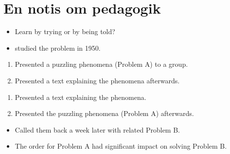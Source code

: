 \mode*

\section{En notis om pedagogik}

\begin{frame}
  \begin{question}
    \begin{itemize}
      \item Learn by trying or by being told?
    \end{itemize}
  \end{question}
\end{frame}

\begin{frame}
  \begin{example}
    \begin{itemize}
      \item \Textcite{Szekely1950} studied the problem in 1950.
    \end{itemize}
    \begin{enumerate}
      \item<2,3> Presented a puzzling phenomena (Problem A) to a group.
      \item<2,3> Presented a text explaining the phenomena afterwards.
    \end{enumerate}
    \begin{enumerate}
      \item<3> Presented a text explaining the phenomena.
      \item<3> Presented the puzzling phenomena (Problem A) afterwards.
    \end{enumerate}
    \begin{itemize}
      \item<4> Called them back a week later with related Problem B.
      \item<4> The order for Problem A had significant impact on solving 
        Problem B.
    \end{itemize}
  \end{example}
\end{frame}


